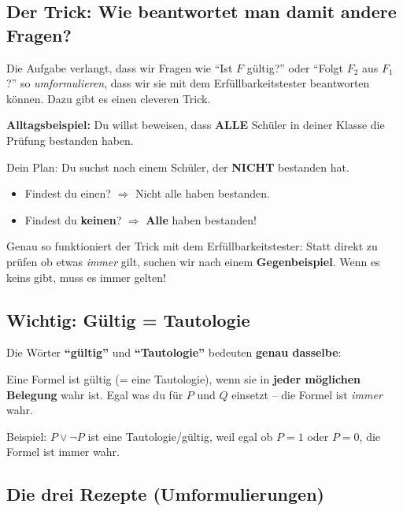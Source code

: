 \documentclass[a4paper,12pt]{article}
\begin{document}
\subsection{Der Trick: Wie beantwortet man damit andere Fragen?}

Die Aufgabe verlangt, dass wir Fragen wie "`Ist $F$ g\"ultig?"' oder
"`Folgt $F_2$ aus $F_1$?"' so \emph{umformulieren}, dass wir sie mit dem
Erf\"ullbarkeitstester beantworten k\"onnen. Dazu gibt es einen cleveren Trick.

\begin{analogie}
\textbf{Alltagsbeispiel:} Du willst beweisen, dass \textbf{ALLE} Sch\"uler
in deiner Klasse die Pr\"ufung bestanden haben.

\medskip
Dein Plan: Du suchst nach einem Sch\"uler, der \textbf{NICHT} bestanden hat.

\medskip
\begin{itemize}
\item Findest du einen? $\Rightarrow$ Nicht alle haben bestanden.
\item Findest du \textbf{keinen}? $\Rightarrow$ \textbf{Alle} haben bestanden!
\end{itemize}

\medskip
Genau so funktioniert der Trick mit dem Erf\"ullbarkeitstester:
Statt direkt zu pr\"ufen ob etwas \emph{immer} gilt, suchen wir nach
einem \textbf{Gegenbeispiel}. Wenn es keins gibt, muss es immer gelten!
\end{analogie}

\subsection{Wichtig: G\"ultig = Tautologie}

\begin{merkbox}
Die W\"orter \textbf{"`g\"ultig"'} und \textbf{"`Tautologie"'} bedeuten
\textbf{genau dasselbe}:

\medskip
Eine Formel ist g\"ultig (= eine Tautologie), wenn sie in \textbf{jeder
m\"oglichen Belegung} wahr ist. Egal was du f\"ur $P$ und $Q$ einsetzt
-- die Formel ist \emph{immer} wahr.

\medskip
Beispiel: $P \vee \neg P$ ist eine Tautologie/g\"ultig, weil
egal ob $P = 1$ oder $P = 0$, die Formel ist immer wahr.
\end{merkbox}

\subsection{Die drei Rezepte (Umformulierungen)}
\end{document}
